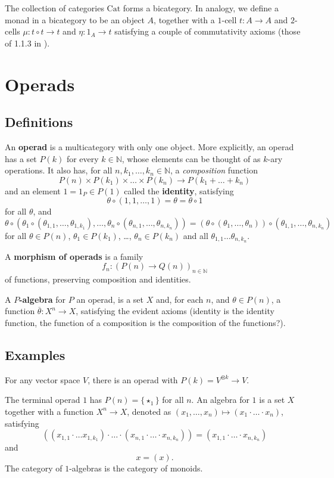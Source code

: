 \documentclass{amsbook}
\theoremstyle{definition}
\begin{document}
  The collection of categories $ \mathrm{Cat} $ forms a bicategory. In analogy, we define a monad in a bicategory to be an object $ A $, together with a $ 1 $-cell $ t: A \to A $ and $ 2 $-cells $ \mu: t \circ t \to t $ and $ \eta: 1_A \to t $ satisfying a couple of commutativity axioms (those of 1.1.3 in \cite{higher-operads-higher-categories}).

  \section{Operads}
  \subsection{Definitions}
  An \textbf{operad} is a multicategory with only one object. More explicitly, an operad has a set $ P(k) $ for every $ k \in \mathbb N $, whose elements can be thought of as $ k $-ary operations. It also has, for all $ n, k_1, \dots, k_n \in \mathbb N $, a \textit{composition} function
  \[ P(n) \times P(k_1) \times \dots \times P(k_n) \to P(k_1 + \dots + k_n) \]
  and an element $ 1 = 1_P \in P(1) $ called the \textbf{identity}, satisfying
  \[ \theta \circ (1, 1, \dots, 1) = \theta = \theta \circ 1 \]
  for all $ \theta $, and
  \[ \theta \circ(\theta_1 \circ(\theta_{1, 1}, \dots, \theta_{1, k_1}), \dots, \theta_n \circ (\theta_{n, 1}, \dots, \theta_{n, k_n})) = (\theta \circ (\theta_1, \dots, \theta_n)) \circ (\theta_{1, 1}, \dots, \theta_{n, k_n}) \]
  for all $ \theta \in P(n) $, $ \theta_1 \in P(k_1) $, \dots, $ \theta_n \in P(k_n) $ and all $ \theta_{1, 1} \dots \theta_{n, k_n} $.

  A \textbf{morphism of operads} is a family
  \[ f_n : (P(n) \to Q(n))_{n \in \mathbb N} \]
  of functions, preserving composition and identities.

  A \textbf{$ P $-algebra} for $ P $ an operad, is a set $ X $ and, for each $ n $, and $ \theta \in P(n) $, a function $ \overline{\theta}: X^n \to X $, satisfying the evident axioms (identity is the identity function, the function of a composition is the composition of the functions?).

  \subsection{Examples}
  For any vector space $ V $, there is an operad with $ P(k) = V^{\otimes k} \to V $.

  The terminal operad $ 1 $ has $ P(n) = \{ \star_1 \} $ for all $ n $. An algebra for $ 1 $ is a set $ X $ together with a function $ X^n \to X $, denoted as $ (x_1, \dots, x_n) \mapsto (x_1 \cdot \dots \cdot x_n) $, satisfying
  \[ ((x_{1, 1} \cdot \dots x_{1, k_1}) \cdot \dots \cdot (x_{n, 1} \cdot \dots \cdot x_{n, k_n})) = (x_{1, 1} \cdot \dots \cdot x_{n, k_n}) \]
  and
  \[ x = (x). \]
  The category of $ 1 $-algebras is the category of monoids.
\end{document}
